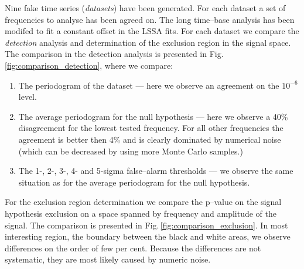 Nine fake time series (\emph{datasets}) have been generated. For each dataset a set of frequencies to analyse has been agreed on. The long time--base analysis has been modifed to fit a constant offset in the LSSA fits. For each dataset we compare the \emph{detection} analysis and determination of the exclusion region in the signal space. The comparison in the detection analysis is presented in Fig.\,\ref{fig:comparison_detection}, where we compare:
\begin{enumerate}
  \item The periodogram of the dataset --- here we observe an agreement on  the $10^{-6}$ level.
  \item The average periodogram for the null hypothesis --- here we observe a 40\% disagreement for the lowest tested frequency. For all other frequencies the agreement is better then 4\% and is clearly dominated by numerical noise (which can be decreased by using more Monte Carlo samples.)
  \item The 1-, 2-, 3-, 4- and 5-sigma false--alarm thresholds --- we observe the same situation as for the average periodogram for the null hypothesis.
\end{enumerate}
For the exclusion region determination we compare the p--value on the signal hypothesis exclusion on a space spanned by frequency and amplitude of the signal. The comparison is presented in Fig.\,\ref{fig:comparison_exclusion}. In most interesting region, the boundary between the black and white areas, we observe differences on the order of few per cent. Because the differences are not systematic, they are most likely caused by numeric noise.

